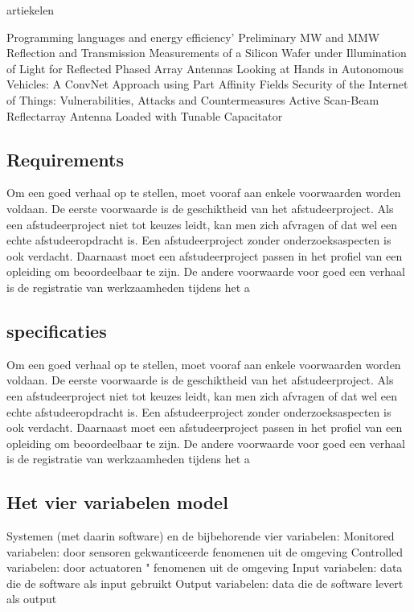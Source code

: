 artiekelen

Programming languages and energy efficiency’
Preliminary MW and MMW Reflection and Transmission Measurements of a Silicon Wafer under Illumination of Light for Reflected Phased Array Antennas
Looking at Hands in Autonomous Vehicles: A ConvNet Approach using Part Affinity Fields
Security of the Internet of Things: Vulnerabilities, Attacks and Countermeasures
Active Scan-Beam Reflectarray Antenna Loaded with Tunable Capacitator
\subsection{Requirements}

Om een goed verhaal op te stellen, moet vooraf aan enkele voorwaarden
worden voldaan. De eerste voorwaarde is de geschiktheid van het
afstudeerproject. Als een afstudeerproject niet tot keuzes leidt, kan
men zich afvragen of dat wel een echte afstudeeropdracht is. Een
afstudeerproject zonder onderzoeksaspecten is ook verdacht. Daarnaast
moet een afstudeerproject passen in het profiel van een opleiding om
beoordeelbaar te zijn. De andere voorwaarde voor goed een verhaal is
de registratie van werkzaamheden tijdens het a
\subsection{specificaties}

Om een goed verhaal op te stellen, moet vooraf aan enkele voorwaarden
worden voldaan. De eerste voorwaarde is de geschiktheid van het
afstudeerproject. Als een afstudeerproject niet tot keuzes leidt, kan
men zich afvragen of dat wel een echte afstudeeropdracht is. Een
afstudeerproject zonder onderzoeksaspecten is ook verdacht. Daarnaast
moet een afstudeerproject passen in het profiel van een opleiding om
beoordeelbaar te zijn. De andere voorwaarde voor goed een verhaal is
de registratie van werkzaamheden tijdens het a
\subsection{Het vier variabelen model}

Systemen (met daarin software) en de bijbehorende vier variabelen:
Monitored variabelen: door sensoren gekwanticeerde
fenomenen uit de omgeving
Controlled variabelen: door actuatoren \bestuurde"
fenomenen uit de omgeving
Input variabelen: data die de software als input gebruikt
Output variabelen: data die de software levert als output

